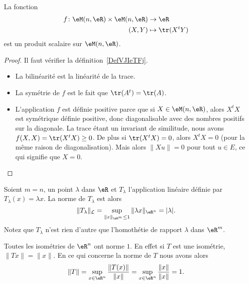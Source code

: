 \begin{proposition} \label{PropMAQoKAg}
	La fonction
	\begin{equation}
		\begin{aligned}
			f\colon \eM(n,\eR)\times \eM(n,\eR) & \to \eR           \\
			(X,Y)                               & \mapsto \tr(X^tY)
		\end{aligned}
	\end{equation}
	est un produit scalaire sur \( \eM(n,\eR)\).
\end{proposition}

\begin{proof}
	Il faut vérifier la définition~\ref{DefVJIeTFj}.
	\begin{itemize}
		\item La bilinéarité est la linéarité de la trace.
		\item La symétrie de \( f\) est le fait que \( \tr(A^t)=\tr(A)\).
		\item L'application \( f\) est définie positive parce que si \( X\in \eM(n,\eR)\), alors \( X^tX\) est symétrique définie positive, donc diagonalisable avec des nombres positifs sur la diagonale. La trace étant un invariant de similitude, nous avons \( f(X,X)=\tr(X^tX)\geq 0\). De plus si \( \tr(X^tX)=0\), alors \( X^tX=0\) (pour la même raison de diagonalisation). Mais alors \( \| Xu \|=0\) pour tout \( u\in E\), ce qui signifie que \( X=0\).
	\end{itemize}
\end{proof}

\begin{example}     \label{EXooHDCWooHragNA}
	Soient \( m=n\), un point \( \lambda\) dans \( \eR\) et \( T_{\lambda}\) l'application linéaire définie par \( T_{\lambda}(x)=\lambda x\). La norme de \( T_{\lambda}\) est alors
	\[
		\|T_{\lambda}\|_{\mathcal{L}}=\sup_{\|x\|_{\eR^m}\leq 1}\|\lambda x\|_{\eR^n}= |\lambda|.
	\]
	Notez que \( T_{\lambda}\) n'est rien d'autre que l'homothétie de rapport \( \lambda\) dans \( \eR^m\).
\end{example}

\begin{example}     \label{EXooVXENooZbtBNi}
	Toutes les isométries de \( \eR^n\) ont norme \( 1\). En effet si \( T\) est une isométrie, \( \| Tx \|=\| x \|\). En ce qui concerne la norme de \( T\) nous avons alors
	\begin{equation}
		\| T \|=\sup_{x\in\eR^n}\frac{ \| T(x) \| }{ \| x \| }=\sup_{x\in\eR^n}\frac{ \| x \| }{ \| x \| }=1.
	\end{equation}
\end{example}


